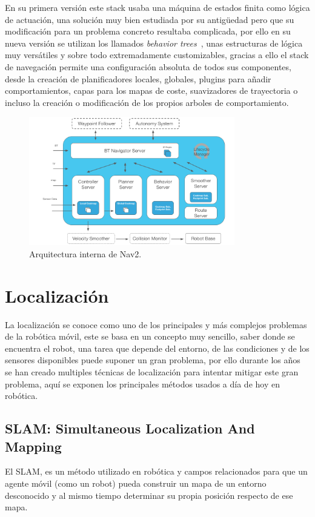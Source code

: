 En su primera versión este stack usaba una máquina de estados finita como lógica de actuación, una solución muy bien estudiada por su antigüedad
pero que su modificación para un problema concreto resultaba complicada, por ello en su nueva versión se utilizan los llamados 
\textit{behavior trees}~\cite{colledanchise2018behavior}, unas estructuras de lógica muy versátiles y sobre todo extremadamente customizables, 
gracias a ello el stack de navegación permite una configuración absoluta de todos sus componentes, desde la creación de planificadores locales, globales, 
plugins para añadir comportamientos, capas para los mapas de coste, suavizadores de trayectoria o incluso la creación o modificación de los 
propios arboles de comportamiento.
\begin{figure}[h]
    \centering
    \includegraphics[width=0.8\textwidth]{images/nav2_architecture.png}
    \caption{Arquitectura interna de Nav2.}
    \label{fig:nav2_arch}
\end{figure}
\newpage
\section{Localización}
La localización se conoce como uno de los principales y más complejos problemas de la robótica móvil, este se basa en un concepto 
muy sencillo, saber donde se encuentra el robot, una tarea que depende del entorno, de las condiciones y de los sensores disponibles 
puede suponer un gran problema, por ello durante los años se han creado multiples técnicas de localización para intentar mitigar este 
gran problema, aquí se exponen los principales métodos usados a día de hoy en robótica.

\subsection{SLAM: Simultaneous Localization And Mapping}
El SLAM, es un método utilizado en robótica y campos relacionados para que un agente móvil (como un robot) pueda construir un mapa de un 
entorno desconocido y al mismo tiempo determinar su propia posición respecto de ese mapa.

